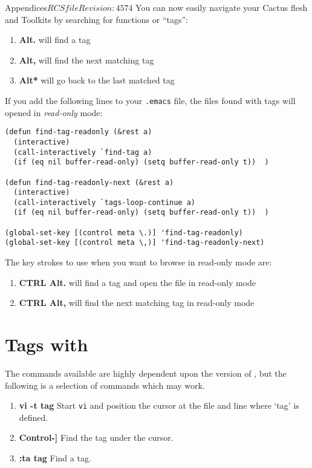 \begin{cactuspart}{Appendices}{$RCSfile$}{$Revision: 4574 $}
You can now easily navigate your Cactus flesh and Toolkits by searching for
functions or ``tags'':
\begin{enumerate}
\item \textbf{ Alt.} will find a tag
\item \textbf{ Alt,} will find the next matching tag
\item \textbf{ Alt*} will go back to the last matched tag
\end{enumerate}
If you add the following lines to your {\tt .emacs} file, the
files found with tags will opened in \emph{read-only} mode:
\begin{verbatim}
(defun find-tag-readonly (&rest a)
  (interactive)
  (call-interactively `find-tag a)
  (if (eq nil buffer-read-only) (setq buffer-read-only t))  )

(defun find-tag-readonly-next (&rest a)
  (interactive)
  (call-interactively `tags-loop-continue a)
  (if (eq nil buffer-read-only) (setq buffer-read-only t))  )

(global-set-key [(control meta \.)] 'find-tag-readonly)
(global-set-key [(control meta \,)] 'find-tag-readonly-next)
\end{verbatim}
The key strokes to use when you want to browse in read-only mode are:
\begin{enumerate}
\item \textbf{CTRL Alt.} will find a tag and open the file in read-only mode
\item \textbf{CTRL Alt,} will find the next matching tag in read-only mode
\end{enumerate}

\section{Tags with }

The commands available are highly dependent upon the version of , but
the following is a selection of commands which may work.


\begin{enumerate}

\item \textbf{vi -t tag}
Start {\tt vi} and position the cursor at the file and line where `tag' is defined.

\item \textbf{Control-{]}}
Find the tag under the cursor.

\item \textbf{:ta tag}
Find a tag.


\end{enumerate}
\end{cactuspart}
